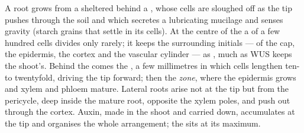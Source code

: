 \begin{proposition}\label{prop:b2:plant-meristems:ram}
A root grows from a  sheltered behind a \emph{},
whose cells are sloughed off as the tip pushes through the soil and
which secretes a lubricating mucilage and senses gravity (starch
grains that settle in its cells). At the centre of the  a
\emph{} of a few hundred cells divides only rarely;
it keeps the surrounding initials --- of the cap, the epidermis, the
cortex and the vascular cylinder --- as , much as WUS
keeps the shoot's. Behind the  comes the \emph{}, a few millimetres in which cells lengthen ten- to
twentyfold, driving the tip forward; then the \emph{
zone}, where the epidermis grows \emph{} and xylem and
phloem mature. Lateral roots arise not at the tip but from the
pericycle, deep inside the mature root, opposite the xylem poles,
and push out through the cortex. Auxin, made in the shoot and
carried down, accumulates at the tip and organises the whole
arrangement; the  sits at its maximum.
\end{proposition}

